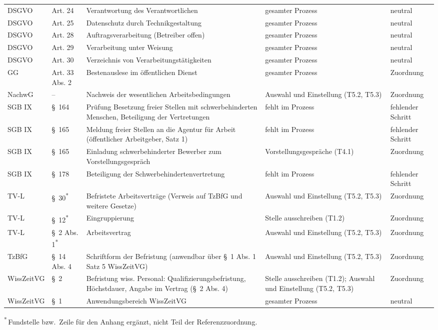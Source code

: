 \begin{small}
\begin{longtable}{@{}>{\raggedright\arraybackslash}p{1.9cm}>{\raggedright\arraybackslash}p{2.0cm}>{\raggedright\arraybackslash}p{5.0cm}>{\raggedright\arraybackslash}p{4.0cm}>{\raggedright\arraybackslash}p{1.8cm}@{}}
DSGVO & Art. 24 & Verantwortung des Verantwortlichen & gesamter Prozess & neutral \\
DSGVO & Art. 25 & Datenschutz durch Technikgestaltung & gesamter Prozess & neutral \\
DSGVO & Art. 28 & Auftragsverarbeitung (Betreiber offen) & gesamter Prozess & neutral \\
DSGVO & Art. 29 & Verarbeitung unter Weisung & gesamter Prozess & neutral \\
DSGVO & Art. 30 & Verzeichnis von Verarbeitungstätigkeiten & gesamter Prozess & neutral \\
GG & Art. 33 Abs. 2 & Bestenauslese im öffentlichen Dienst & gesamter Prozess & Zuordnung \\
NachwG & -- & Nachweis der wesentlichen Arbeitsbedingungen & Auswahl und Einstellung (T5.2, T5.3) & Zuordnung \\
SGB IX & §~164 & Prüfung Besetzung freier Stellen mit schwerbehinderten Menschen, Beteiligung der Vertretungen & fehlt im Prozess & fehlender Schritt \\
SGB IX & §~165 & Meldung freier Stellen an die Agentur für Arbeit (öffentlicher Arbeitgeber, Satz 1) & fehlt im Prozess & fehlender Schritt \\
SGB IX & §~165 & Einladung schwerbehinderter Bewerber zum Vorstellungsgespräch & Vorstellungsgespräche (T4.1) & Zuordnung \\
SGB IX & §~178 & Beteiligung der Schwerbehindertenvertretung & fehlt im Prozess & fehlender Schritt \\
TV-L & §~30\textsuperscript{*} & Befristete Arbeitsverträge (Verweis auf TzBfG und weitere Gesetze) & Auswahl und Einstellung (T5.2, T5.3) & Zuordnung \\
TV-L & §~12\textsuperscript{*} & Eingruppierung & Stelle ausschreiben (T1.2) & Zuordnung \\
TV-L & §~2 Abs. 1\textsuperscript{*} & Arbeitsvertrag & Auswahl und Einstellung (T5.2, T5.3) & Zuordnung \\
TzBfG & §~14 Abs. 4 & Schriftform der Befristung (anwendbar über §~1 Abs. 1 Satz 5 WissZeitVG) & Auswahl und Einstellung (T5.2, T5.3) & Zuordnung \\
WissZeitVG & §~2 & Befristung wiss. Personal: Qualifizierungsbefristung, Höchstdauer, Angabe im Vertrag (§~2 Abs. 4) & Stelle ausschreiben (T1.2); Auswahl und Einstellung (T5.2, T5.3) & Zuordnung \\
WissZeitVG & §~1 & Anwendungsbereich WissZeitVG & gesamter Prozess & neutral \\
\end{longtable}
\end{small}
{\footnotesize \textsuperscript{*}\,Fundstelle bzw.\ Zeile für den Anhang ergänzt, nicht Teil der Referenzzuordnung.\par}
